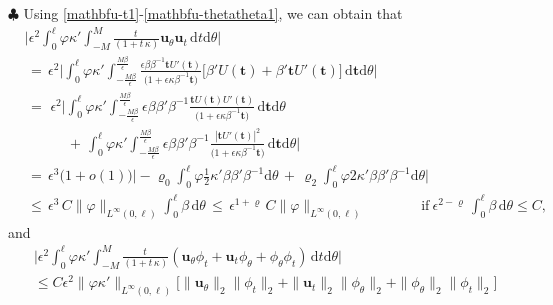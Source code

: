 \documentclass[10pt, reqno]{amsart}
\numberwithin{equation}{section}
\theoremstyle{definition}
\begin{document}
{{\smallskip
\noindent$\clubsuit$
 Using \eqref{mathbfu-t1}-\eqref{mathbfu-thetatheta1}, we can obtain that
\begin{align*}
 &\Bigg|\epsilon^2\int_0^\ell \varphi\kappa' \int_{-M}^{M} \frac{t\,}{(1+t\,\kappa)}
 {\mathbf u}_{\theta}{\mathbf u}_t
 \,{\mathrm d}t{\mathrm d}\theta\Bigg|
\nonumber\\[2mm]
 &\,=\,\epsilon^2\Bigg|\int_0^\ell \varphi\kappa' \displaystyle\int_{-\frac{M\beta}{\epsilon}}^{\frac{M\beta}{\epsilon}}
 \frac{\epsilon  \beta \beta^{-1} {\mathbf t} U'({\mathbf t})}{\big(1+\epsilon \kappa \beta^{-1}{\mathbf t}\big)} \Big[\beta'U({\mathbf t})+\beta' {\mathbf t} U'({\mathbf t})
 \Big]
 \,{\mathrm d}{\mathbf t}{\mathrm d}\theta\Bigg|
\nonumber\\[2mm]
 &\,=\,\,\epsilon^2\Bigg|
 \int_0^\ell \varphi\kappa' \displaystyle\int_{-\frac{M\beta}{\epsilon}}^{\frac{M\beta}{\epsilon}}
 \epsilon  \beta \beta' \beta^{-1} \frac{{\mathbf t} U({\mathbf t})U'({\mathbf t})}{\big(1+\epsilon \kappa \beta^{-1}{\mathbf t}\big)}
 \,{\mathrm d}{\mathbf t}{\mathrm d}\theta
\nonumber\\[2mm]
 &\qquad\quad+\,\int_0^\ell \varphi \kappa' \displaystyle\int_{-\frac{M\beta}{\epsilon}}^{\frac{M\beta}{\epsilon}}
 \epsilon \beta \beta' \beta^{-1}
 \frac{|{\mathbf t} U'({\mathbf t})|^2}{\big(1+\epsilon \kappa \beta^{-1}{\mathbf t}\big)}
 \,{\mathrm d}{\mathbf t}{\mathrm d}\theta
\Bigg|
\nonumber\\[2mm]
 &\,=\,\epsilon^3\big(1+o(1)\big)
 \Bigg|
 -\varrho_0 \int_0^\ell \varphi\frac12 \kappa' \beta \beta' \beta^{-1}{\mathrm d}\theta
 \,+\,
 \varrho_2 \int_0^\ell \varphi 2\kappa' \beta \beta' \beta^{-1} {\mathrm d}\theta
\Bigg|
\nonumber\\[2mm]
 &\,\leq\, \epsilon^3\,C \|\varphi\|_{L^\infty(0,\ell)} \int_0^\ell \beta\,{\mathrm d}\theta
 \,\leq\, \epsilon^{1+\varrho}\,C \|\varphi\|_{L^\infty(0,\ell)}
 \qquad\qquad \text{if}\ \epsilon^{2-\varrho}\,\int_0^\ell \beta\,{\mathrm d}\theta\leq C,
\end{align*}
 and
\begin{align*}
 &\Bigg|\epsilon^2\int_0^\ell \varphi\kappa' \int_{-M}^{M}
 \frac{t\,}{(1+t\,\kappa)}
 ({\mathbf u}_{\theta}\phi_t +{\mathbf u}_t\phi_{\theta}+\phi_{\theta}\phi_t)
 \,{\mathrm d}t{\mathrm d}\theta
 \Bigg|
\nonumber\\[2mm]
 &\leq
 C\epsilon^2\|\varphi\kappa'\|_{L^\infty(0,\ell)}
 \Big[ \|{\mathbf u}_{\theta}\|_2\|\phi_t\|_2+\|{\mathbf u}_t\|_2\|\phi_{\theta}\|_2+\|\phi_{\theta}\|_2\|\phi_t\|_2\Big]
\nonumber\\[2mm]

\end{align*}}}
\end{document}
